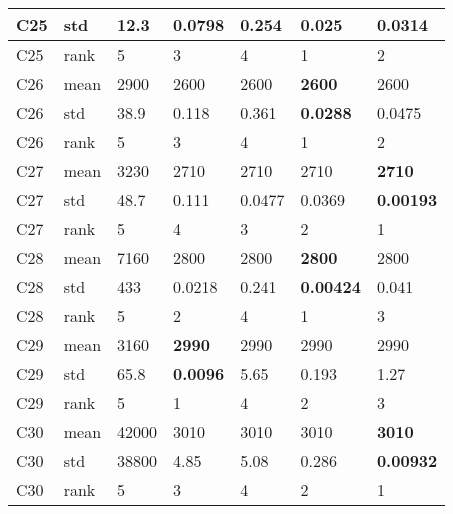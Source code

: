 \begin{table}[]
\begin{tabular}{|l|l|l|l|l|l|l|}
C25                  & std  & 12.3             & 0.0798            & 0.254             & \textbf{0.025}    & 0.0314            \\ \hline
C25                  & rank & 5                & 3                 & 4                 & 1                 & 2                 \\ \hline
C26                  & mean & 2900             & 2600              & 2600              & \textbf{2600}     & 2600              \\ \hline
C26                  & std  & 38.9             & 0.118             & 0.361             & \textbf{0.0288}   & 0.0475            \\ \hline
C26                  & rank & 5                & 3                 & 4                 & 1                 & 2                 \\ \hline
C27                  & mean & 3230             & 2710              & 2710              & 2710              & \textbf{2710}     \\ \hline
C27                  & std  & 48.7             & 0.111             & 0.0477            & 0.0369            & \textbf{0.00193}  \\ \hline
C27                  & rank & 5                & 4                 & 3                 & 2                 & 1                 \\ \hline
C28                  & mean & 7160             & 2800              & 2800              & \textbf{2800}     & 2800              \\ \hline
C28                  & std  & 433              & 0.0218            & 0.241             & \textbf{0.00424}  & 0.041             \\ \hline
C28                  & rank & 5                & 2                 & 4                 & 1                 & 3                 \\ \hline
C29                  & mean & 3160             & \textbf{2990}     & 2990              & 2990              & 2990              \\ \hline
C29                  & std  & 65.8             & \textbf{0.0096}   & 5.65              & 0.193             & 1.27              \\ \hline
C29                  & rank & 5                & 1                 & 4                 & 2                 & 3                 \\ \hline
C30                  & mean & 42000            & 3010              & 3010              & 3010              & \textbf{3010}     \\ \hline
C30                  & std  & 38800            & 4.85              & 5.08              & 0.286             & \textbf{0.00932}  \\ \hline
C30                  & rank & 5                & 3                 & 4                 & 2                 & 1                 \\ \hline
\end{tabular}
\end{table}